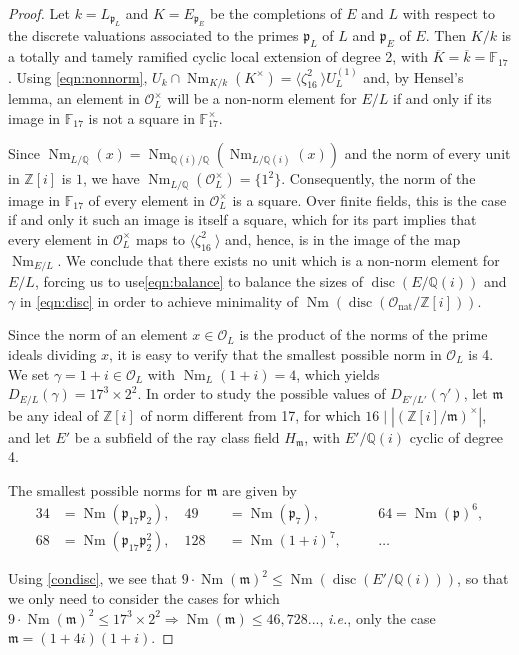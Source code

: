 \documentclass[smallextended]{svjour3}
\newcommand{\F}{\mathbb{F}}
\newcommand{\Q}{\mathbb{Q}}
\newcommand{\Z}{\mathbb{Z}}
\newcommand{\Or}{\mathcal{O}}
\DeclareMathOperator{\Nm}{Nm}
\DeclareMathOperator{\nat}{nat}
\DeclareMathOperator{\disc}{disc}
\begin{document}
\begin{proof}
 Let $k=L_{\mathfrak p_L}$ and $K= E_{\mathfrak p_E}$ be the completions of $E$ and $L$ with respect to the discrete  valuations associated to the primes $\mathfrak p_L$ of $L$ and $\mathfrak p_E$ of $E$.  Then   $K/k$ is a totally and tamely ramified cyclic local extension of degree 2, with $\overline{K}=\overline {k} = \F_{17}$. Using \eqref{eqn:nonnorm}, $U_k \cap \Nm_{K/k}(K^{\times})=\langle{ \zeta}_{16}^2~\rangle U_{L}^{(1)}$ and, by Hensel's lemma, an element in $\Or_L^{\times}$ will be a non-norm element for $E/L$ if and only if its image in  $\F_{17}$ is not a square in $\F_{17}^{\times}$.  

Since $\Nm_{L/\Q}(x)=\Nm_{\Q(i)/\Q}(\Nm_{L/\Q(i)}(x))$ and the norm of every unit in $\Z[i]$ is $1$, we have $\Nm_{L/\Q}(\Or_L^{\times})=\{1^2\}$. Consequently, the norm of the image in $\F_{17}$ of every element in $\Or_L^{\times}$ is a square. Over finite fields, this is the case if and only it such an image is itself a square, which for its part implies that every element in $\Or_L^{\times}$ maps to $\langle{\zeta}_{16}^2~\rangle$ and, hence, is in the image of the map $ \Nm_{E/L}$. We conclude that there exists no unit which is a non-norm element for $E/L$, forcing us to use\eqref{eqn:balance} to balance the sizes of $\disc(E/\Q(i))$ and $\gamma$ in \eqref{eqn:disc} in order to achieve minimality of $\Nm(\disc(\Or_{\nat}/\Z[i]))$. 
\medskip

  Since the norm of an element $x\in \Or_L$ is the product of the norms of the prime ideals dividing $x$, it is easy to verify that the smallest possible norm in $\Or_L$ is 4. We set $\gamma = 1+i \in \Or_L$ with $\Nm_L(1+i) = 4$, which yields $D_{E/L}(\gamma) = 17^3 \times 2^2$.
In order to study the possible values of $D_{E'/L'}(\gamma')$, let $\mathfrak m$ be any ideal of $\Z[i]$ of norm different from 17, for which $16 \mid \left |(\Z[i]/\mathfrak m)^\times\right |$, and let $E'$ be a subfield of the ray class field $H_{\mathfrak m}$, with $E'/\Q(i)$ cyclic of degree 4.
 
The smallest possible norms for $\mathfrak m$ are given by 
\begin{alignat*} 
	34 &= \Nm(\mathfrak p_{17}\mathfrak p_2),\quad 49 &&= \Nm(\mathfrak p_7), \quad &&64 = \Nm(\mathfrak p)^6, \\ 
	68 &= \Nm(\mathfrak p_{17}\mathfrak p_2^2),\quad  128 &&= \Nm(1+i)^7, \quad &&\ldots
\end{alignat*} 

Using \eqref{condisc}, we see that $9\cdot \Nm(\mathfrak m)^2  \le \Nm(\disc(E'/\Q(i)))$, so that we only need to consider the cases for which $9\cdot \Nm(\mathfrak m)^2  \le 17^3 \times 2^2 \Rightarrow \Nm(\mathfrak m) \le 46,728...$, \emph{i.e.}, only the case $\mathfrak m = (1+4i)(1+i)$. 


\end{proof}
\end{document}

